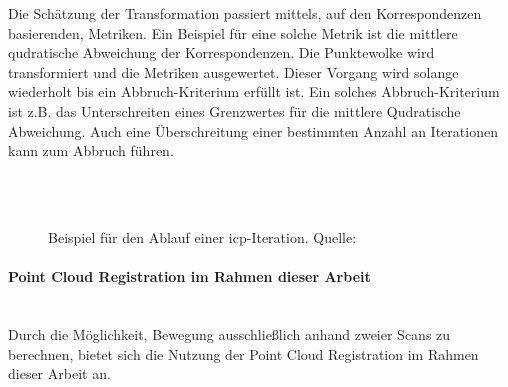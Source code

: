 Die Schätzung der Transformation passiert mittels, auf den Korrespondenzen basierenden, Metriken.
Ein Beispiel für eine solche Metrik ist die mittlere qudratische Abweichung der Korrespondenzen.
Die Punktewolke wird transformiert und die Metriken ausgewertet.
Dieser Vorgang wird solange wiederholt bis ein Abbruch-Kriterium erfüllt ist.
Ein solches Abbruch-Kriterium ist z.B. das Unterschreiten eines Grenzwertes für die mittlere Qudratische Abweichung.
Auch eine Überschreitung einer bestimmten Anzahl an Iterationen kann zum Abbruch führen.

\begin{figure}[H]
     \\
     \\
    \caption{Beispiel für den Ablauf einer \acf{icp}-Iteration. Quelle: \cite[chapters 3]{icp2015}}
\end{figure}

\paragraph{Point Cloud Registration im Rahmen dieser Arbeit} \mbox{}\\
Durch die Möglichkeit, Bewegung ausschließlich anhand zweier Scans zu berechnen, 
bietet sich die Nutzung der Point Cloud Registration im Rahmen dieser Arbeit an.

